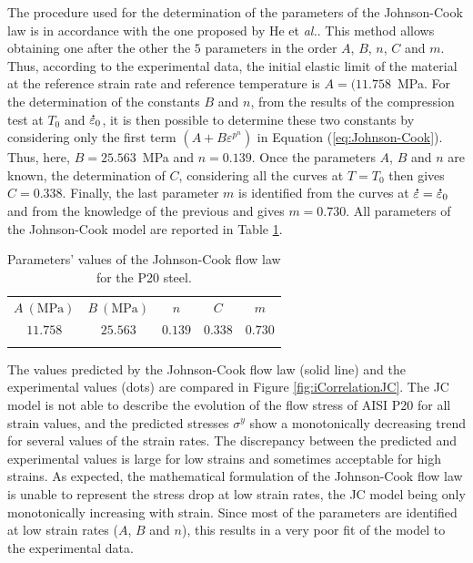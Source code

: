 \documentclass[twoside,english,1p,final,sort&compress]{elsarticle}
\makeatletter
\theoremstyle{plain}
\newcommand{\mdot}[1]{\accentset{\mbox{\bfseries .}}{#1}}
\newcommand*{\eal}{et \emph{al.}\@\xspace}
\makeatother
\begin{document}
The procedure used for the determination of the parameters of the Johnson-Cook law is in accordance with the one proposed by He \eal \cite{He-2013}.
This method allows obtaining one after the other the $5$ parameters in the order $A$, $B$, $n$, $C$ and $m$.
Thus, according to the experimental data, the initial elastic limit of the material at the reference strain rate and reference temperature is $A=(11.758$~MPa.
For the determination of the constants $B$ and $n$, from the results of the compression test at $T_0$ and $\mdot\varepsilon_0$, it is then possible to determine these two constants by considering only the first term $\left(A+B\varepsilon^{p^{n}}\right)$ in Equation (\ref{eq:Johnson-Cook}).
Thus, here, $B=25.563$~MPa and $n=0.139$.
Once the parameters $A$, $B$ and $n$ are known, the determination of $C$, considering all the curves at $T=T_0$ then gives $C=0.338$.
Finally, the last parameter $m$ is identified from the curves at $\mdot\varepsilon=\mdot\varepsilon_0$ and from the knowledge of the previous and gives $m=0.730$.
All parameters of the Johnson-Cook model are reported in Table \ref{tab:JCparams}.

\begin{table}[h!]
\centering
\caption{Parameters' values of the Johnson-Cook flow law for the P20 steel.}
\begin{tabular}{ccccc}
\hline
$A~(\text{MPa})$ & $B~(\text{MPa})$ & $n$ & $C$ & $m$\\
$11.758$ & $25.563$ &  $0.139$ & $0.338$ & $0.730$\\ \hline
\label{tab:JCparams}
\end{tabular}
\end{table}

The values predicted by the Johnson-Cook flow law (solid line) and the experimental values (dots) are compared in Figure \ref{fig:iCorrelationJC}.
The JC model is not able to describe the evolution of the flow stress of AISI P20 for all strain values, and the predicted stresses $\sigma^y$ show a monotonically decreasing trend for several values of the strain rates.
The discrepancy between the predicted and experimental values is large for low strains and sometimes acceptable for high strains.
As expected, the mathematical formulation of the Johnson-Cook flow law is unable to represent the stress drop at low strain rates, the JC model being only monotonically increasing with strain.
Since most of the parameters are identified at low strain rates ($A$, $B$ and $n$), this results in a very poor fit of the model to the experimental data.
\end{document}

